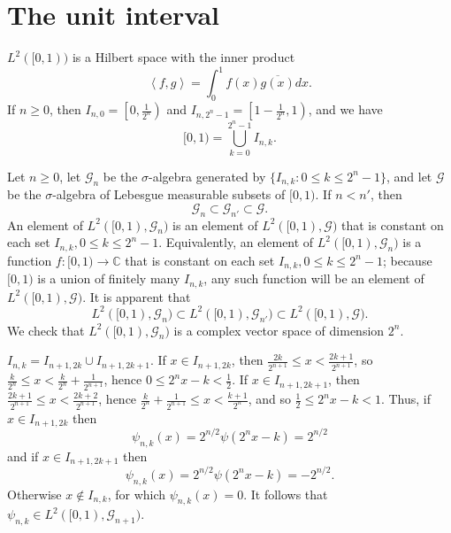 \documentclass{article}
\newcommand{\inner}[2]{\left\langle #1, #2 \right\rangle}
\theoremstyle{definition}
\begin{document}
\section{The unit interval}
$L^2([0,1))$ is a Hilbert space with the inner product
\[
\inner{f}{g} = \int_0^1 f(x) \overline{g(x)} dx.
\]
If $n \geq 0$, then $I_{n,0}=\left[0,\frac{1}{2^n}\right)$ and $I_{n,2^n-1}=\left[1-\frac{1}{2^n},1\right)$, and we have
\[
[0,1)=\bigcup_{k=0}^{2^n-1} I_{n,k}.
\]


Let $n \geq 0$,
let $\mathscr{G}_n$ be the $\sigma$-algebra generated by $\{I_{n,k}: 0 \leq k \leq 2^n-1\}$, and let
$\mathscr{G}$ be the $\sigma$-algebra of Lebesgue measurable subsets of $[0,1)$. If $n<n'$, then
\[
\mathscr{G}_n \subset \mathscr{G}_{n'} \subset \mathscr{G}.
\]
An element of $L^2([0,1),\mathscr{G}_n)$ is an element of $L^2([0,1),\mathscr{G})$ that is constant on each
set $I_{n,k}, 0 \leq k \leq 2^n-1$. Equivalently, an element of $L^2([0,1),\mathscr{G}_n)$ is a function
$f:[0,1) \to \mathbb{C}$ that is constant on each set $I_{n,k}, 0 \leq k \leq 2^n-1$; because $[0,1)$ is a union
of finitely many $I_{n,k}$, any such function will be an element of $L^2([0,1),\mathscr{G})$.
It is apparent that
\[
L^2([0,1),\mathscr{G}_n) \subset L^2([0,1),\mathscr{G}_{n'}) \subset L^2([0,1),\mathscr{G}).
\]
We check that
$L^2([0,1),\mathscr{G}_n)$ is a complex vector space of dimension $2^n$.

$I_{n,k}=I_{n+1,2k} \cup I_{n+1,2k+1}$. If $x \in I_{n+1,2k}$, then $\frac{2k}{2^{n+1}} \leq x < \frac{2k+1}{2^{n+1}}$, so
$\frac{k}{2^n} \leq x< \frac{k}{2^n}+\frac{1}{2^{n+1}}$, hence
$0 \leq 2^nx-k< \frac{1}{2}$. If $x \in I_{n+1,2k+1}$, then $\frac{2k+1}{2^{n+1}} \leq x < \frac{2k+2}{2^{n+1}}$, hence
$\frac{k}{2^n}+\frac{1}{2^{n+1}} \leq x < \frac{k+1}{2^n}$, and so $\frac{1}{2} \leq 2^nx-k < 1$.
Thus, if $x \in I_{n+1,2k}$ then
\[
\psi_{n,k}(x)=2^{n/2}\psi(2^nx-k) = 2^{n/2}
\]
and  if $x \in I_{n+1,2k+1}$ then
\[
\psi_{n,k}(x)=2^{n/2}\psi(2^nx-k)=-2^{n/2}.
\]
Otherwise $x \not \in I_{n,k}$, for which $\psi_{n,k}(x)=0$.
It follows that $\psi_{n,k} \in L^2([0,1),\mathscr{G}_{n+1})$.
\end{document}
